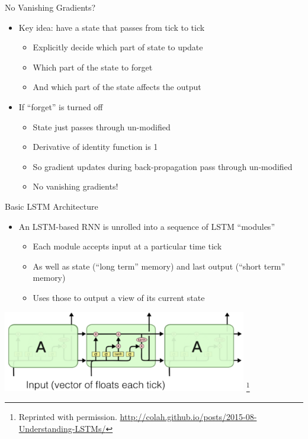 \documentclass[aspectratio=169]{beamer}
\begin{document}
\begin{frame}{No Vanishing Gradients?}
        \begin{itemize}
	\item Key idea: have a state that passes from tick to tick
	\begin{itemize}
	\item Explicitly decide which part of state to update
	\item Which part of the state to forget
	\item And which part of the state affects the output
	\end{itemize}
	\item If ``forget'' is turned off 
	\begin{itemize}
	\item State just passes through un-modified
	\item Derivative of identity function is 1
	\item So gradient updates during back-propagation pass through un-modified
	\item No vanishing gradients!
	\end{itemize}
\end{itemize}
\end{frame}
\begin{frame}{Basic LSTM Architecture}
\begin{itemize}
	\item An LSTM-based RNN is unrolled into a sequence of LSTM ``modules''
	\begin{itemize}
	\item Each module accepts input at a particular time tick
	\item As well as state (``long term'' memory) and last output (``short term'' memory)
	\item Uses those to output a view of its current state	
	\end{itemize}
\end{itemize}
\includegraphics[width=0.8\textwidth]{lectLSTM/LSTMNew.png}
\footnote{Reprinted with permission. \url{http://colah.github.io/posts/2015-08-Understanding-LSTMs/}}

\end{frame}
\end{document}
